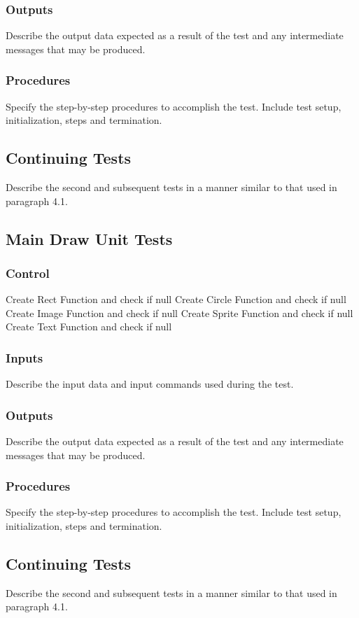 \documentclass[11pt, oneside]{article}   	%
\begin{document}
\subsubsection{Outputs}
Describe the output data expected as a result of the test and any intermediate messages that may be produced.

\subsubsection{Procedures}
Specify the step-by-step procedures to accomplish the test. Include test setup, initialization, steps and termination.

\subsection{Continuing Tests}
Describe the second and subsequent tests in a manner similar to that used in paragraph 4.1.

\subsection{Main Draw Unit Tests}
\subsubsection{Control}
Create Rect Function and check if null
Create Circle Function and check if null
Create Image Function and check if null
Create Sprite Function and check if null
Create Text Function and check if null

\subsubsection{Inputs}
Describe the input data and input commands used during the test.

\subsubsection{Outputs}
Describe the output data expected as a result of the test and any intermediate messages that may be produced.

\subsubsection{Procedures}
Specify the step-by-step procedures to accomplish the test. Include test setup, initialization, steps and termination.

\subsection{Continuing Tests}
Describe the second and subsequent tests in a manner similar to that used in paragraph 4.1.
\end{document}
